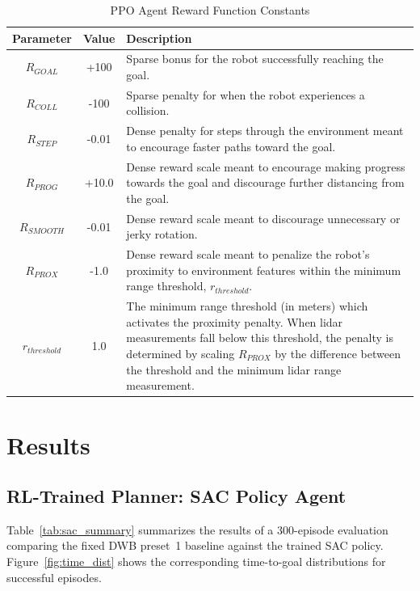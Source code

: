 \documentclass[conference]{IEEEtran}
\begin{document}
        \begin{table}
            \centering
            \caption{PPO Agent Reward Function Constants}\label{tab:ppo_values}
            \begin{tabular}{|c|c|p{5cm}|}
                \hline
                \textbf{Parameter} & \textbf{Value} & \textbf{Description} \\
                \hline
                $R_{GOAL}$ & +100 & Sparse bonus for the robot successfully reaching the goal.\\
                \hline
                $R_{COLL}$ & -100 & Sparse penalty for when the robot experiences a collision.\\
                \hline
                $R_{STEP}$ & -0.01 & Dense penalty for steps through the environment meant to encourage faster paths toward the goal.\\
                \hline
                $R_{PROG}$ & +10.0 & Dense reward scale meant to encourage making progress towards the goal and discourage further distancing from the goal.\\
                \hline
                $R_{SMOOTH}$ & -0.01 & Dense reward scale meant to discourage unnecessary or jerky rotation.\\
                \hline
                $R_{PROX}$ & -1.0 & Dense reward scale meant to penalize the robot's proximity to environment features within the minimum range threshold, $r_{threshold}$. \\
                \hline
                $r_{threshold}$ & 1.0 & The minimum range threshold (in meters) which activates the proximity penalty. When lidar measurements fall below this threshold, the penalty is determined by scaling $R_{PROX}$ by the difference between the threshold and the minimum lidar range measurement.\\
                \hline
            \end{tabular}
        \end{table}

\section{Results}
    \subsection{RL-Trained Planner: SAC Policy Agent}
    Table~\ref{tab:sac_summary} summarizes the results of a 300-episode evaluation comparing the fixed DWB preset~1 baseline against the trained SAC policy. Figure~\ref{fig:time_dist} shows the corresponding time-to-goal distributions for successful episodes.
\end{document}
